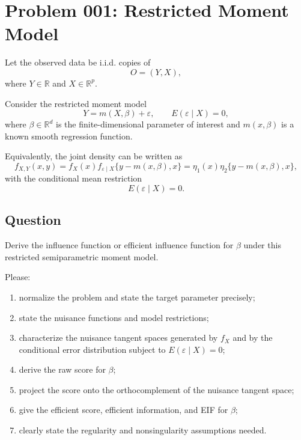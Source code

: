\documentclass{article}
\begin{document}
\section*{Problem 001: Restricted Moment Model}

Let the observed data be i.i.d. copies of
\[
O=(Y,X),
\]
where \(Y\in\mathbb R\) and \(X\in\mathbb R^p\).

Consider the restricted moment model
\[
Y=m(X,\beta)+\varepsilon,
\qquad
E(\varepsilon\mid X)=0,
\]
where \(\beta\in\mathbb R^d\) is the finite-dimensional parameter of
interest and \(m(x,\beta)\) is a known smooth regression function.

Equivalently, the joint density can be written as
\[
f_{X,Y}(x,y)
=
f_X(x)f_{\varepsilon\mid X}\{y-m(x,\beta),x\}
=
\eta_1(x)\eta_2\{y-m(x,\beta),x\},
\]
with the conditional mean restriction
\[
E(\varepsilon\mid X)=0.
\]

\subsection*{Question}

Derive the influence function or efficient influence function for
\(\beta\) under this restricted semiparametric moment model.

Please:

\begin{enumerate}
\item normalize the problem and state the target parameter precisely;
\item state the nuisance functions and model restrictions;
\item characterize the nuisance tangent spaces generated by \(f_X\) and by
      the conditional error distribution subject to \(E(\varepsilon\mid X)=0\);
\item derive the raw score for \(\beta\);
\item project the score onto the orthocomplement of the nuisance tangent space;
\item give the efficient score, efficient information, and EIF for \(\beta\);
\item clearly state the regularity and nonsingularity assumptions needed.
\end{enumerate}
\end{document}
